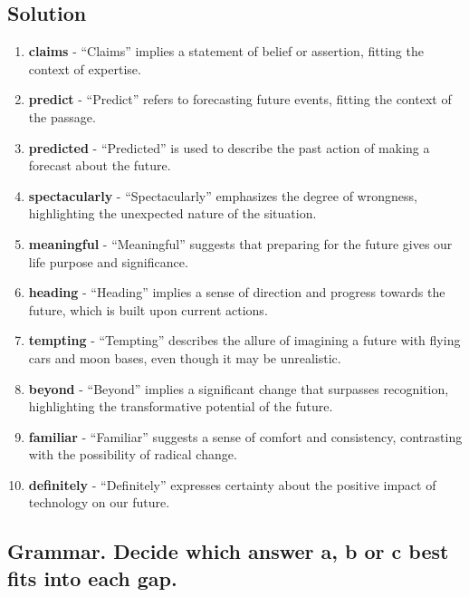 \subsection*{Solution}
\begin{enumerate}
      \item \textbf{claims} - “Claims” implies a statement of belief or assertion, fitting the context of expertise.
      \item \textbf{predict} - “Predict” refers to forecasting future events, fitting the context of the passage.
      \item \textbf{predicted} - “Predicted” is used to describe the past action of making a forecast about the future.
      \item \textbf{spectacularly} - “Spectacularly” emphasizes the degree of wrongness, highlighting the unexpected nature of the situation.
      \item \textbf{meaningful} - “Meaningful” suggests that preparing for the future gives our life purpose and significance.
      \item \textbf{heading} - “Heading” implies a sense of direction and progress towards the future, which is built upon current actions.
      \item \textbf{tempting} - “Tempting” describes the allure of imagining a future with flying cars and moon bases, even though it may be unrealistic.
      \item \textbf{beyond} - “Beyond” implies a significant change that surpasses recognition, highlighting the transformative potential of the future.
      \item \textbf{familiar} - “Familiar” suggests a sense of comfort and consistency, contrasting with the possibility of radical change.
      \item \textbf{definitely} - “Definitely” expresses certainty about the positive impact of technology on our future.
\end{enumerate}

\subsection*{Grammar. Decide which answer a, b or c best fits into each gap.}


